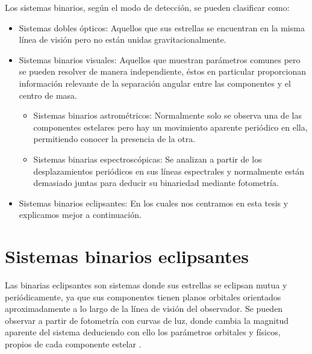 \documentclass[12pt,oneside,openany,letter]{book}
\begin{document}
\noindent Los sistemas binarios, según el modo de detección, se pueden clasificar como:
\begin{itemize}
    \item Sistemas dobles ópticos: Aquellos que sus estrellas se encuentran en la misma línea de visión pero no están unidas gravitacionalmente.
    \item Sistemas binarios visuales: Aquellos que muestran parámetros comunes pero se pueden resolver de manera independiente, éstos en particular proporcionan información relevante de la separación angular entre las componentes y el centro de masa.
    \begin{itemize}
        \item Sistemas binarios astrométricos: Normalmente solo se observa una de las componentes estelares pero hay un movimiento aparente periódico en ella, permitiendo conocer la presencia de la otra.
        \item Sistemas binarias espectroscópicas: Se analizan a partir de los desplazamientos periódicos en sus líneas espectrales y normalmente están demasiado juntas para deducir su binariedad mediante fotometría.
    \end{itemize}
    \item Sistemas binarios eclipsantes: En los cuales nos centramos en esta tesis y explicamos mejor a continuación.
\end{itemize}

\section*{Sistemas binarios eclipsantes}

Las binarias eclipsantes son sistemas donde sus estrellas se eclipsan mutua y periódicamente, ya que sus componentes tienen planos orbitales orientados aproximadamente a lo largo de la línea de visión del observador. Se pueden observar a partir de fotometría con curvas de luz, donde cambia la magnitud aparente del sistema deduciendo con ello los parámetros orbitales y físicos, propios de cada componente estelar \citep{carroll2017introduction}.
\end{document}
